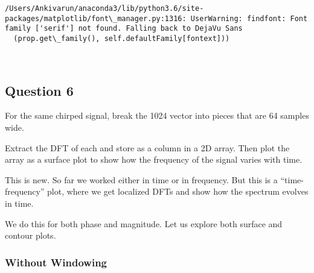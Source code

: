 \documentclass[11pt]{article}
\begin{document}
    \begin{Verbatim}[commandchars=\\\{\}]
/Users/Ankivarun/anaconda3/lib/python3.6/site-packages/matplotlib/font\_manager.py:1316: UserWarning: findfont: Font family ['serif'] not found. Falling back to DejaVu Sans
  (prop.get\_family(), self.defaultFamily[fontext]))

    \end{Verbatim}

    \begin{center}
    \end{center}
    { \hspace*{\fill} \\}
    
    \subsection{Question 6}\label{question-6}

For the same chirped signal, break the 1024 vector into pieces that are
64 samples wide.

Extract the DFT of each and store as a column in a 2D array. Then plot
the array as a surface plot to show how the frequency of the signal
varies with time.

This is new. So far we worked either in time or in frequency. But this
is a ``time- frequency'' plot, where we get localized DFTs and show how
the spectrum evolves in time.

We do this for both phase and magnitude. Let us explore both surface and
contour plots.

\subsubsection{Without Windowing}\label{without-windowing}
\end{document}
